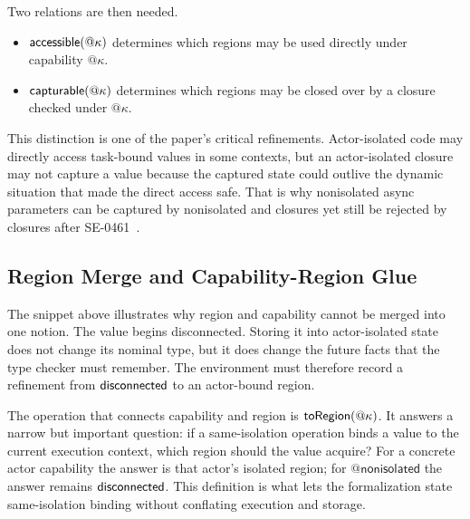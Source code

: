 Two relations are then needed.

\begin{itemize}
  \item $\textsf{accessible}(@\kappa)$ determines which regions may be used directly under capability $@\kappa$.
  \item $\textsf{capturable}(@\kappa)$ determines which regions may be closed over by a closure checked under $@\kappa$.
\end{itemize}

This distinction is one of the paper's critical refinements. Actor-isolated code may directly access task-bound values in some contexts, but an actor-isolated closure may not capture a  value because the captured state could outlive the dynamic situation that made the direct access safe. That is why nonisolated async parameters can be captured by nonisolated and  closures yet still be rejected by  closures after SE-0461~\cite{se0461}.

\subsection{Region Merge and Capability-Region Glue}


The snippet above illustrates why region and capability cannot be merged into one notion. The value  begins disconnected. Storing it into actor-isolated state does not change its nominal type, but it does change the future facts that the type checker must remember. The environment must therefore record a refinement from $\textsf{disconnected}$ to an actor-bound region.


The operation that connects capability and region is $\textsf{toRegion}(@\kappa)$. It answers a narrow but important question: if a same-isolation operation binds a value to the current execution context, which region should the value acquire? For a concrete actor capability the answer is that actor's isolated region; for $@\textsf{nonisolated}$ the answer remains $\textsf{disconnected}$. This definition is what lets the formalization state same-isolation binding without conflating execution and storage.

